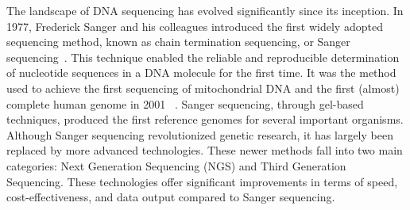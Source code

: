 The landscape of DNA sequencing has evolved significantly since its inception. In 1977, Frederick Sanger and his colleagues introduced the first widely adopted sequencing method, known as chain termination sequencing, or Sanger sequencing~\cite{sanger_sequencing}. This technique enabled the reliable and reproducible determination of nucleotide sequences in a DNA molecule for the first time. It was the method used to achieve the first sequencing of mitochondrial DNA and the first (almost) complete human genome in 2001 ~\cite{mitochondrialDNA,first_human_genome}. Sanger sequencing, through gel-based techniques, produced the first reference genomes for several important organisms.
Although Sanger sequencing revolutionized genetic research, it has largely been replaced by more advanced technologies. These newer methods fall into two main categories: Next Generation Sequencing (NGS) and Third Generation Sequencing. These technologies offer significant improvements in terms of speed, cost-effectiveness, and data output compared to Sanger sequencing. 

